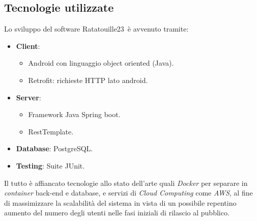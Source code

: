 \subsection{Tecnologie utilizzate}
Lo sviluppo del software Ratatouille23\texttrademark \ è avvenuto tramite:
\begin{itemize}
    \item \textbf{Client}:
          \begin{itemize}
              \item Android con linguaggio object oriented (Java).
              \item Retrofit: richieste HTTP lato android.
          \end{itemize}
    \item \textbf{Server}:
          \begin{itemize}
              \item Framework Java Spring boot.
              \item RestTemplate.
          \end{itemize}
    \item \textbf{Database}: PostgreSQL.
    \item \textbf{Testing}: Suite JUnit.
\end{itemize}
Il tutto è affiancato tecnologie allo stato dell'arte quali \textit{Docker} per separare in \textit{container} back-end e database, e servizi di \textit{Cloud Computing} come \textit{AWS},
al fine di massimizzare la scalabilità del sistema in vista di un possibile repentino aumento del numero degli utenti nelle fasi
iniziali di rilascio al pubblico.